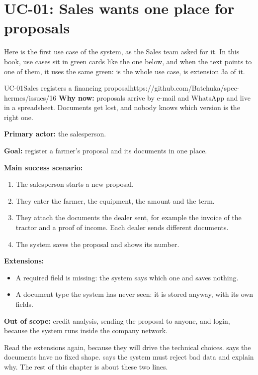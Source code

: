 \section{UC-01: Sales wants one place for proposals}

Here is the first use case of the system, as the Sales team asked for it.
In this book, use cases sit in green cards like the one below, and when the
text points to one of them, it uses the same green:  is the whole
use case,  is extension 3a of it.

\begin{usecase}{UC-01}{Sales registers a financing proposal}{https://github.com/Batchuka/spec-hermes/issues/16}
\textbf{Why now:} proposals arrive by e-mail and WhatsApp and live in a
spreadsheet. Documents get lost, and nobody knows which version is the right
one.

\textbf{Primary actor:} the salesperson.

\textbf{Goal:} register a farmer's proposal and its documents in one place.

\textbf{Main success scenario:}
\begin{enumerate}
  \item The salesperson starts a new proposal.
  \item They enter the farmer, the equipment, the amount and the term.
  \item They attach the documents the dealer sent, for example the invoice of
        the tractor and a proof of income. Each dealer sends different
        documents.
  \item The system saves the proposal and shows its number.
\end{enumerate}

\textbf{Extensions:}
\begin{itemize}
  \item[2a.] A required field is missing: the system says which one and saves
        nothing.
  \item[3a.] A document type the system has never seen: it is stored anyway,
        with its own fields.
\end{itemize}

\textbf{Out of scope:} credit analysis, sending the proposal to anyone, and
login, because the system runs inside the company network.
\end{usecase}

Read the extensions again, because they will drive the technical choices.
 says the documents have no fixed shape.  says the
system must reject bad data and explain why. The rest of this chapter is
about these two lines.


